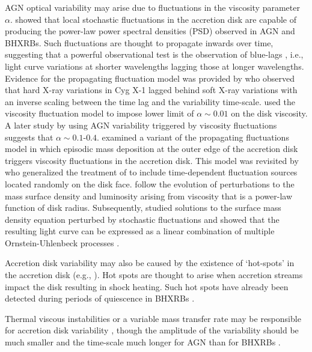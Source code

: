 \documentclass[a4paper,fleqn,usenatbib]{mnras}
\begin{document}
AGN optical variability may arise due to fluctuations in the \citet{ShakuraSunyaev73} viscosity parameter $\alpha$. \citet{Lyubarskii97} showed that local stochastic fluctuations in the accretion disk are capable of producing the power-law power spectral densities (PSD) observed in AGN and BHXRBs. Such fluctuations are thought to propagate inwards over time, suggesting that a powerful observational test is the observation of blue-lags \citep{UttleyAccretion}, i.e., light curve variations at shorter wavelengths lagging those at longer wavelengths. Evidence for the propagating fluctuation model was provided by \citet{Miyamoto88} who observed that hard X-ray variations in Cyg X-1 lagged behind soft X-ray variations with an inverse scaling between the time lag and the variability time-scale. \citet{Starling04} used the viscosity fluctuation model to impose lower limit of $\alpha \sim 0.01$ on the disk viscosity. A later study by \citet{King07} using AGN variability triggered by viscosity fluctuations suggests that $\alpha \sim 0.1$-$0.4$. \citet{Wood01} examined a variant of the \citet{Lyubarskii97} propagating fluctuations model in which episodic mass deposition at the outer edge of the accretion disk triggers viscosity fluctuations in the accretion disk. This model was revisited by \citet{Titarchuk07} who generalized the treatment of \citet{Wood01} to include time-dependent fluctuation sources located randomly on the disk face. \citet{Titarchuk07} follow the evolution of perturbations to the mass surface density and luminosity arising from viscosity that is a power-law function of disk radius. Subsequently, \citet{Kelly11} studied solutions to the surface mass density equation perturbed by stochastic fluctuations and showed that the resulting light curve can be expressed as a linear combination of multiple Ornstein-Uhlenbeck processes \citep{Gillespie96,Kelly09}. 

Accretion disk variability may also be caused by the existence of `hot-spots' in the accretion disk (e.g., \citealt{MaccaroneAccretion}). Hot spots are thought to arise when accretion streams impact the disk resulting in shock heating. Such hot spots have already been detected during periods of quiescence in BHXRBs \citep{Froning11,McClintock95}. 

Thermal viscous instabilities or a variable mass transfer rate may be responsible for accretion disk variability \citep{Lasota01,Coriat12}, though the amplitude of the variability should be much smaller and the time-scale much longer for AGN than for BHXRBs \citep{Hameury09}.
\end{document}
